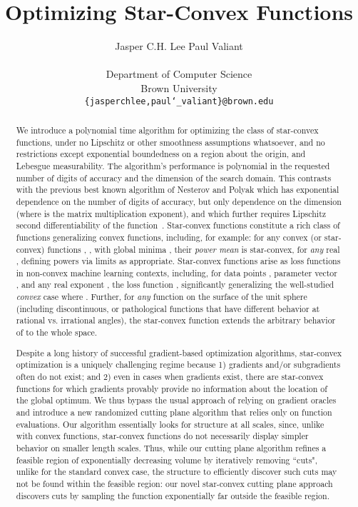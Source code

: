 \documentclass[11pt,letter]{article}
\title{Optimizing Star-Convex Functions}
\author{
Jasper C.H. Lee
\quad
Paul Valiant\\ \ \\
Department of Computer Science\\
Brown University\\
\texttt{\{jasperchlee,paul\char`_valiant\}@brown.edu}
}
\numberwithin{nTheorems}{section}
\begin{document}
\maketitle
\begin{abstract}
We introduce a polynomial time algorithm for optimizing the class of star-convex functions, under no Lipschitz or other smoothness assumptions whatsoever, and no restrictions except exponential boundedness on a region about the origin, and Lebesgue measurability. The algorithm's performance is polynomial in the requested number of digits of accuracy and the dimension of the search domain. This contrasts with the previous best known algorithm of Nesterov and Polyak which has exponential dependence on the number of digits of accuracy, but only  dependence on the dimension  (where  is the matrix multiplication exponent), and which further requires Lipschitz second differentiability of the function~\cite{Nesterov:2006}. Star-convex functions constitute a rich class of functions generalizing convex functions, including, for example: for any convex (or star-convex) functions , , with global minima , their \emph{power mean}  is star-convex, for \emph{any} real , defining powers via limits as appropriate. Star-convex functions arise as loss functions in non-convex machine learning contexts, including, for data points , parameter vector , and any real exponent , the loss function , significantly generalizing the well-studied \emph{convex} case where . Further, for \emph{any} function  on the surface of the unit sphere (including discontinuous, or pathological functions that have different behavior at rational vs. irrational angles), the star-convex function  extends the arbitrary behavior of  to the whole space.

Despite a long history of successful gradient-based optimization algorithms, star-convex optimization is a uniquely challenging regime because 1) gradients and/or subgradients often do not exist; and 2) even in cases when gradients exist, there are star-convex functions for which gradients provably provide no information about the location of the global optimum. We thus bypass the usual approach of relying on gradient oracles and introduce a new randomized cutting plane algorithm that relies only on function evaluations. Our algorithm essentially looks for structure at all scales, since, unlike with convex functions, star-convex functions do not necessarily display simpler behavior on smaller length scales. Thus, while our cutting plane algorithm refines a feasible region of exponentially decreasing volume by iteratively removing ``cuts", unlike for the standard convex case, the structure to efficiently discover such cuts may not be found within the feasible region: our novel star-convex cutting plane approach discovers cuts by sampling the function exponentially far outside the feasible region.


\end{abstract}
\end{document}
